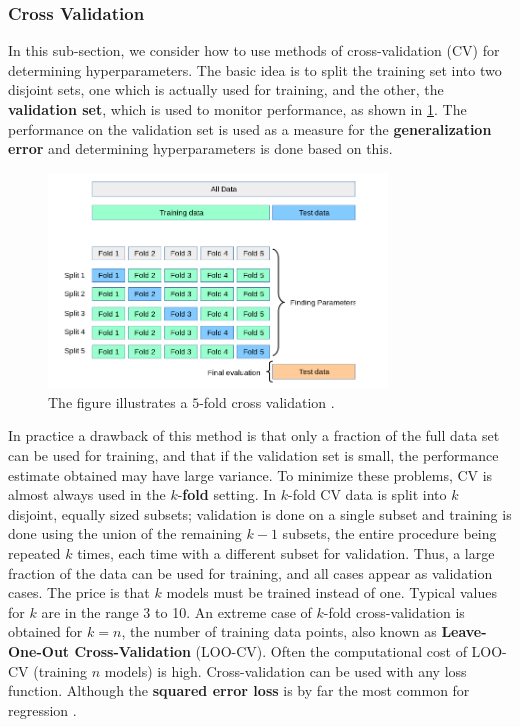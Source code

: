 \documentclass[10pt]{article}
\theoremstyle{definition}
\begin{document}
\subsubsection{Cross Validation}
In this sub-section, we consider how to use methods of cross-validation (CV) for determining hyperparameters. The basic idea is to split the training set into two disjoint sets, one which is actually used for training, and the other, the \textbf{validation set}, which is used to monitor performance, as shown in \cref{fig:cross:validation}. The performance on the validation set is used as a measure for the \textbf{generalization error} and determining hyperparameters is done based on this.
\begin{figure}[b!]
\centering
\includegraphics[width=9cm]{figs/cross-validation.png}
\caption{The figure illustrates a $5$-fold cross validation \cite{sklearn}.}
\label{fig:cross:validation}
\end{figure}
In practice a drawback of this method is that only a fraction of the full data set can be used for training, and that if the validation set is small, the performance estimate obtained may have large variance. To minimize these problems, CV is almost always used in the $k$-\textbf{fold} setting. In $k$-fold CV data is split into $k$ disjoint, equally sized subsets; validation is done on a single subset and training is done using the union of the remaining $k -1$ subsets, the entire procedure being repeated $k$ times, each time with a different subset for validation. Thus, a large fraction of the data can be used for training, and all cases appear as validation cases. The price is that $k$ models must be trained instead of one. Typical values for $k$ are in the range 3 to 10. An extreme case of $k$-fold cross-validation is obtained for $k = n$, the number of training data points, also known as \textbf{Leave-One-Out Cross-Validation} (LOO-CV). Often the computational cost of LOO-CV (training $n$ models) is high. Cross-validation can be used with any loss function. Although the \textbf{squared error loss} is by far the most common for regression \cite[Chapter 5]{Rasmussen2006}. 
\end{document}
